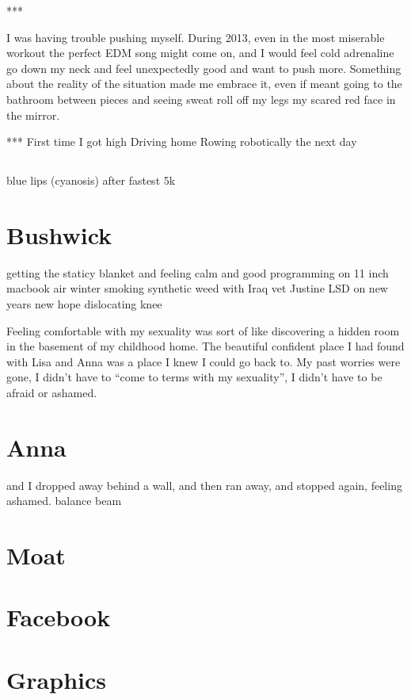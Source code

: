 \documentclass[12pt]{memoir}
\begin{document}
***

I was having trouble pushing myself.  During 2013, even in the most miserable
workout the perfect EDM song might come on, and I would feel cold adrenaline go
down my neck and feel unexpectedly good and want to push more.  Something about
the reality of the situation made me embrace it, even if meant going to the
bathroom between pieces and seeing sweat roll off my legs my scared red face in
the mirror.  

***
First time I got high
Driving home
Rowing robotically the next day

\section{}
blue lips (cyanosis) after fastest 5k

\chapter{Bushwick}
getting the staticy blanket and feeling calm and good
programming on 11 inch macbook air
winter
smoking synthetic weed with Iraq vet
Justine
LSD on new years
new hope
dislocating knee

Feeling comfortable with my sexuality was sort of like discovering a hidden room
in the basement of my childhood home.  The beautiful confident place I had found
with Lisa and Anna was a place I knew I could go back to.  My past worries were
gone, I didn't have to ``come to terms with my sexuality'', I didn't have to be
afraid or ashamed. 

\chapter{Anna}
and I dropped away behind a wall, and then ran away, and stopped again, feeling ashamed.
balance beam

\chapter{Moat}


\chapter{Facebook}


\chapter{Graphics}
\end{document}
